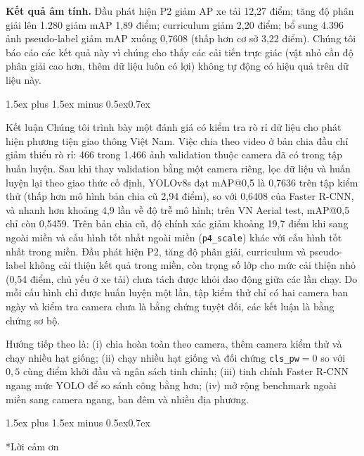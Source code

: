 \documentclass[10pt,journal,letterpaper]{IEEEtran}
\makeatletter
\renewcommand\section{\@startsection{section}{1}{\z@}%
  {1.5ex plus 1.5ex minus 0.5ex}{0.7ex}{\normalfont\scshape\raggedright}}
\makeatother
\begin{document}
\textbf{Kết quả âm tính.} Đầu phát hiện P2 giảm AP xe tải 12,27 điểm; tăng độ phân giải lên 1.280 giảm mAP 1,89 điểm; curriculum giảm 2,20 điểm; bổ sung 4.396 ảnh pseudo-label giảm mAP xuống 0,7608 (thấp hơn cơ sở 3,22 điểm). Chúng tôi báo cáo các kết quả này vì chúng cho thấy các cải tiến trực giác (vật nhỏ cần độ phân giải cao hơn, thêm dữ liệu luôn có lợi) không tự động có hiệu quả trên dữ liệu này.

\section{Kết luận}
Chúng tôi trình bày một đánh giá có kiểm tra rò rỉ dữ liệu cho phát hiện phương tiện giao thông Việt Nam. Việc chia theo video ở bản chia đầu chỉ giảm thiểu rò rỉ: 466 trong 1.466 ảnh validation thuộc camera đã có trong tập huấn luyện. Sau khi thay validation bằng một camera riêng, lọc dữ liệu và huấn luyện lại theo giao thức cố định, YOLOv8s đạt mAP@0,5 là 0,7636 trên tập kiểm thử (thấp hơn mô hình bản chia cũ 2,94 điểm), so với 0,6408 của Faster R-CNN, và nhanh hơn khoảng 4,9 lần về độ trễ mô hình; trên VN Aerial test, mAP@0,5 chỉ còn 0,5459. Trên bản chia cũ, độ chính xác giảm khoảng 19,7 điểm khi sang ngoài miền và cấu hình tốt nhất ngoài miền (\texttt{p4\_scale}) khác với cấu hình tốt nhất trong miền. Đầu phát hiện P2, tăng độ phân giải, curriculum và pseudo-label không cải thiện kết quả trong miền, còn trọng số lớp cho mức cải thiện nhỏ (0,54 điểm, chủ yếu ở xe tải) chưa tách được khỏi dao động giữa các lần chạy. Do mỗi cấu hình chỉ được huấn luyện một lần, tập kiểm thử chỉ có hai camera ban ngày và kiểm tra camera chưa là bằng chứng tuyệt đối, các kết luận là bằng chứng sơ bộ.

Hướng tiếp theo là: (i) chia hoàn toàn theo camera, thêm camera kiểm thử và chạy nhiều hạt giống; (ii) chạy nhiều hạt giống và đối chứng \texttt{cls\_pw}$=0$ so với $0{,}5$ cùng điểm khởi đầu và ngân sách tinh chỉnh; (iii) tinh chỉnh Faster R-CNN ngang mức YOLO để so sánh công bằng hơn; (iv) mở rộng benchmark ngoài miền sang camera ngang, ban đêm và nhiều địa phương.

\section*{Lời cảm ơn}
\end{document}
